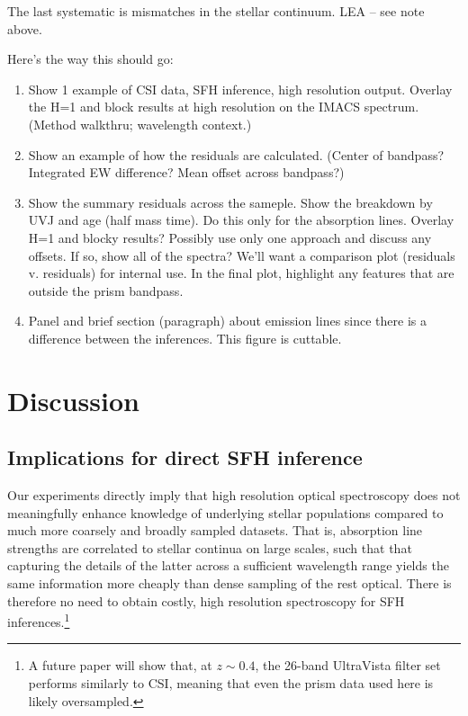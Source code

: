 \documentclass[a4paper,fleqn,usenatbib]{mnras}
\newcommand{\bfb}{\color{myblue}}
\newcommand{\benum}{\begin{enumerate}}
\newcommand{\eenum}{\end{enumerate}}
\begin{document}
The last systematic is mismatches in the stellar continuum. {\bfb LEA -- see note above.}

Here's the way this should go:
\benum
	\item Show 1 example of CSI data, SFH inference, high resolution output. Overlay the H=1 and block
		results at high resolution on the IMACS spectrum. (Method walkthru; wavelength context.)
	\item Show an example of how the residuals are calculated. (Center of bandpass? Integrated EW
		difference? Mean offset across bandpass?)
	\item Show the summary residuals across the sameple. Show the breakdown by UVJ and age 
		(half mass time). 	Do this only for the absorption lines. Overlay H=1 and blocky results? Possibly use
		only one approach and discuss any offsets. If so, show all of the spectra? We'll want a comparison 
		plot (residuals v. residuals) for internal use. In the final plot, highlight any features that are 
		outside the 	prism bandpass.
	\item Panel and brief section (paragraph) about emission lines since there is a difference between
		the inferences. This figure is cuttable.
\eenum
\fi


\section{Discussion}
\label{sec:discussion}



\subsection{Implications for direct SFH inference}
\label{sec:sedMap}

Our experiments directly imply that high resolution optical spectroscopy does not meaningfully 
enhance knowledge of underlying stellar populations compared to much more coarsely and broadly 
sampled datasets. That is, absorption line strengths are correlated to stellar continua on large scales, 
such that that capturing the details of the latter across a sufficient wavelength range yields the same 
information more cheaply than dense sampling of the rest optical. There is therefore no need to obtain 
costly, high resolution spectroscopy for SFH inferences.\footnote{A future 
paper will show that, at $z\sim0.4$, the 26-band UltraVista filter set \citep{Muzzin13} performs 
similarly to CSI, meaning that even the prism data used here is likely oversampled.}
\end{document}
